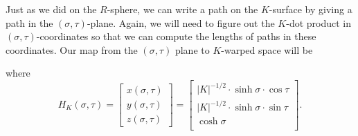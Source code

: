 \documentclass[handout,newpage,hints,,12pt,noauthor,nooutcomes]{ximera}
\begin{document}
Just as we did on the $R$-sphere, we can write a path on the
$K$-surface by giving a path in the $(\sigma,\tau)$-plane. Again, we
will need to figure out the $K$-dot product in
$(\sigma,\tau)$-coordinates so that we can compute the lengths of
paths in these coordinates. Our map from the $(\sigma,\tau)$ plane to $K$-warped space will be
\begin{center}
\end{center}
where
\[
H_K(\sigma,\tau) = 
\begin{bmatrix}
x(\sigma,\tau)  \\
y(\sigma,\tau)  \\
z(\sigma,\tau)  
\end{bmatrix}
=
\begin{bmatrix}
  |K|^{-1/2}\cdot \sinh\sigma\cdot \cos \tau  \\
  |K|^{-1/2}\cdot \sinh\sigma\cdot \sin\tau\\
   \cosh \sigma \\
\end{bmatrix}.
\]
\end{document}
